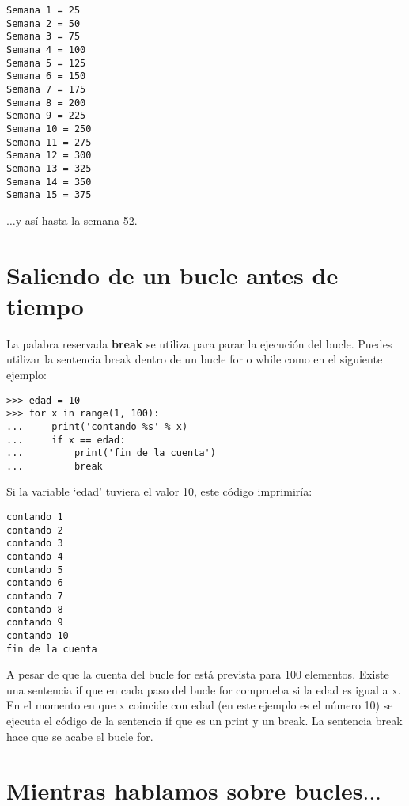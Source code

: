 \begin{listing}
\begin{verbatim}
Semana 1 = 25
Semana 2 = 50
Semana 3 = 75
Semana 4 = 100
Semana 5 = 125
Semana 6 = 150
Semana 7 = 175
Semana 8 = 200
Semana 9 = 225
Semana 10 = 250
Semana 11 = 275
Semana 12 = 300
Semana 13 = 325
Semana 14 = 350
Semana 15 = 375
\end{verbatim}
\end{listing}

$\ldots$y así hasta la semana 52.

\section{Saliendo de un bucle antes de tiempo}

La palabra reservada \textbf{break} se utiliza para parar la ejecución del bucle. Puedes utilizar la sentencia break dentro de un bucle for o while como en el siguiente ejemplo:

\begin{listing}
\begin{verbatim}
>>> edad = 10
>>> for x in range(1, 100):
...     print('contando %s' % x)
...     if x == edad:
...         print('fin de la cuenta')
...         break
\end{verbatim}
\end{listing}

Si la variable `edad' tuviera el valor 10, este código imprimiría:

\begin{listing}
\begin{verbatim}
contando 1
contando 2
contando 3
contando 4
contando 5
contando 6
contando 7
contando 8
contando 9
contando 10
fin de la cuenta
\end{verbatim}
\end{listing}

A pesar de que la cuenta del bucle for está prevista para 100 elementos. Existe una sentencia if que en cada paso del bucle for comprueba si la edad es igual a x. En el momento en que x coincide con edad (en este ejemplo es el número 10) se ejecuta el código de la sentencia if que es un print y un break. La sentencia break hace que se acabe el bucle for.


\section{Mientras hablamos sobre bucles$\ldots$}

